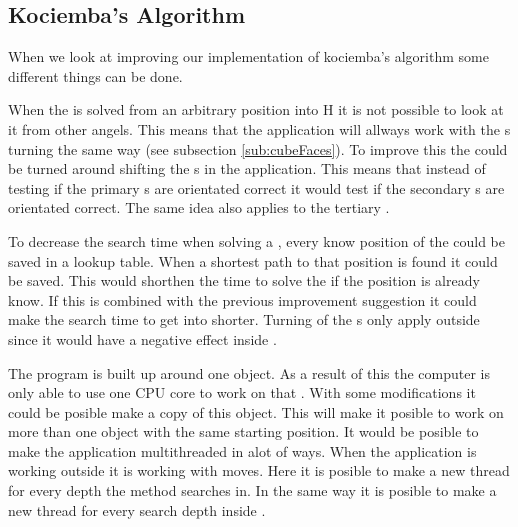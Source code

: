 \subsection{Kociemba's Algorithm}
When we look at improving our implementation of kociemba's algorithm some different things can be done.
	
When the \rubik{} is solved from an arbitrary position into H it is not possible to look at it from other angels. 
This means that the application will allways work with the \face{}s turning the same way (see subsection \ref{sub:cubeFaces}).
To improve this the \rubik{} could be turned around shifting the \face{}s in the application.
This means that instead of testing if the primary \face{} \cubie{}s are orientated correct it would test if the secondary \face{} \cubie{}s are orientated correct. 
The same idea also applies to the tertiary \face{}.
	
To decrease the search time when solving a \rubik{}, every know position of the \rubik{} could be saved in a lookup table.
When a shortest path to that position is found it could be saved.
This would shorthen the time to solve the \rubik{} if the position is already know.
If this is combined with the previous improvement suggestion it could make the search time to get into  shorter.
Turning of the \face{}s only apply outside  since it would have a negative effect inside . 
	 
The program is built up around one \cube{} object.
As a result of this the computer is only able to use one CPU core to work on that \cube{}.
With some modifications it could be posible make a copy of this \cube{} object.
This will make it posible to work on more than one \cube{} object with the same starting position.
It would be posible to make the application multithreaded in alot of ways.
When the application is working outside  it is working with  moves.
Here it is posible to make a new thread for every depth the method searches in.
In the same way it is posible to make a new thread for every search depth inside .



\begin{comment}
Write about the following improvements:


Both the move into H and in H could be saved in a lookup table to increase the speed.
Cloning the cube, to make the program multithreaded.
Running the program on a x64 bit processer has a lot of influence on the program. 
\end{comment}